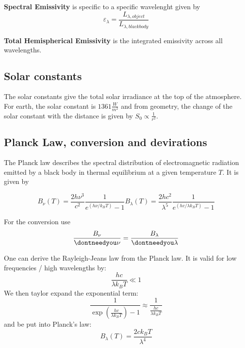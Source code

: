 \documentclass[12pt, a4paper]{article} %
\let\d\dontneedyou
\DeclareMathOperator{\d}{d}
\newcommand{\para}[1]{\left({#1}\right)}
\begin{document}
\textbf{Spectral Emissivity} is specific to a specific wavelenght given by
\begin{equation}
	\varepsilon_\lambda= \frac{L_{\lambda, object}}{L_{\lambda, blackbody}}
\end{equation}

\textbf{Total Hemispherical Emissivity} is the integrated emissivity across all wavelengths.

\subsection{Solar constants}

The solar constants give the total solar irradiance at the top of the atmosphere. For earth, the solar constant is $1361 \frac{W}{m^2}$ and from geometry, the change of the solar constant with the distance is given by $S_0 \propto \frac{1}{r^2}$.

\subsection{Planck Law, conversion and devirations}

The Planck law describes the spectral distribution of electromagnetic radiation emitted by a black body in thermal equilibrium at a given temperature $T$. It is given by

\begin{subequations}
\begin{equation}
	B_\nu(T) = \frac{2h\nu^3}{c^2} \frac{1}{e^{(h\nu/k_BT)}-1}
\end{equation}
\begin{equation}
	B_\lambda(T) = \frac{2hc^2}{\lambda^5} \frac{1}{e^{(hc/\lambda k_BT)}-1}
\end{equation}
\end{subequations}

For the conversion use
\begin{equation}
	\frac{B_\nu}{\d \nu} = \frac{B_\lambda}{\d \lambda}
\end{equation}

One can derive the Rayleigh-Jeans law from the Planck law. It is valid for low frequencies / high wavelengths by:
\begin{equation}
	\frac{hc}{\lambda k_BT} \ll 1
\end{equation}
We then taylor expand the exponential term:
\begin{equation}
	\frac{1}{\exp\para{\frac{hc}{\lambda k_BT}} - 1} \approx \frac{1}{\frac{hc}{\lambda k_BT}}
\end{equation}
and be put into Planck's law:
\begin{equation}
	B_\lambda(T) = \frac{2ck_BT}{\lambda^4}
\end{equation}
\end{document}
